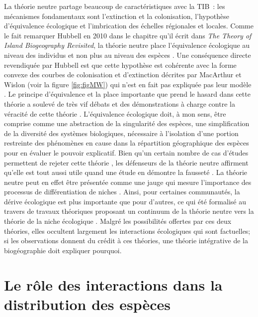 La théorie neutre partage beaucoup de caractéristiques avec la TIB~: les
mécanismes fondamentaux sont l'extinction et la colonisation,
l'hypothèse d'équivalence écologique et l'imbrication des échelles
régionales et locales. Comme le fait remarquer Hubbell en 2010 dans le
chapitre qu'il écrit dans \emph{The Theory of Island Biogeography
Revisited}, la théorie neutre place l'équivalence écologique au niveau
des individus et non plus au niveau des espèces \citep{Hubbell2010}. Une
conséquence directe revendiquée par Hubbell est que cette hypothèse est
cohérente avec la forme convexe des courbes de colonisation et
d'extinction décrites par MacArthur et Wislon (voir la figure
\ref{fig:figMW}) qui n'est en fait pas expliquée pas leur modèle
\citep{Hubbell2010}. Le principe d'équivalence et la place importante
que prend le hasard dans cette théorie a soulevé de très vif débats et
des démonstrations à charge contre la véracité de cette théorie
\citep[voir par exemple][ et \citet{Ricklefs2003}]{McGill2003}.
L'équivalence écologique doit, à mon sens, être comprise comme une
abstraction de la singularité des espèces, une simplification de la
diversité des systèmes biologiques, nécessaire à l'isolation d'une
portion restreinte des phénomènes en cause dans la répartition
géographique des espèces pour en évaluer le pouvoir explicatif. Bien
qu'un certain nombre de cas d'études permettent de rejeter cette théorie
\citep{McGill2003, John2007}, les défenseurs de la théorie neutre
affirment qu'elle est tout aussi utile quand une étude en démontre la
fausseté \citep{Rosindell2012}. La théorie neutre peut en effet être
présentée comme une jauge qui mesure l'importance des processus de
différentiation de niches \citep{Wennekes2012}. Ainsi, pour certaines
communautés, la dérive écologique est plus importante que pour d'autres,
ce qui été formalisé au travers de travaux théoriques proposant un
continuum de la théorie neutre vers la théorie de la niche écologique
\citep{Gravel2006a}. Malgré les possibilités offertes par ces deux
théories, elles occultent largement les interactions écologiques qui
sont factuelles; si les observations donnent du crédit à ces théories,
une théorie intégrative de la biogéographie doit expliquer pourquoi.

\section*{Le rôle des interactions dans la distribution des
espèces}\label{le-ruxf4le-des-interactions-dans-la-distribution-des-espuxe8ces}

